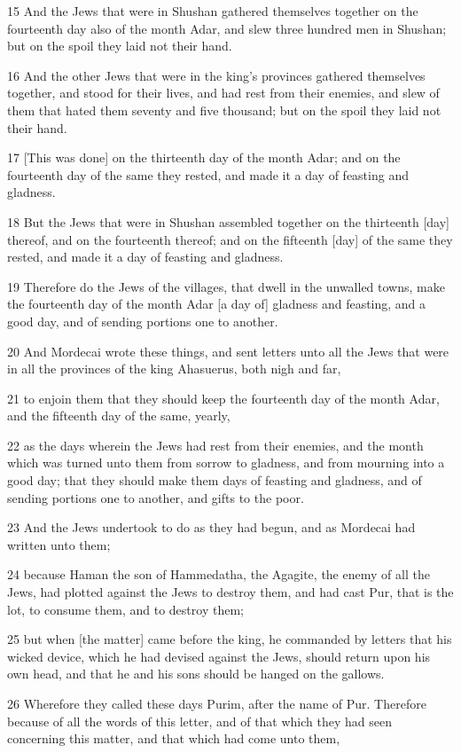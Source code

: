 \par 15 And the Jews that were in Shushan gathered themselves together on the fourteenth day also of the month Adar, and slew three hundred men in Shushan; but on the spoil they laid not their hand.
\par 16 And the other Jews that were in the king's provinces gathered themselves together, and stood for their lives, and had rest from their enemies, and slew of them that hated them seventy and five thousand; but on the spoil they laid not their hand.
\par 17 [This was done] on the thirteenth day of the month Adar; and on the fourteenth day of the same they rested, and made it a day of feasting and gladness.
\par 18 But the Jews that were in Shushan assembled together on the thirteenth [day] thereof, and on the fourteenth thereof; and on the fifteenth [day] of the same they rested, and made it a day of feasting and gladness.
\par 19 Therefore do the Jews of the villages, that dwell in the unwalled towns, make the fourteenth day of the month Adar [a day of] gladness and feasting, and a good day, and of sending portions one to another.
\par 20 And Mordecai wrote these things, and sent letters unto all the Jews that were in all the provinces of the king Ahasuerus, both nigh and far,
\par 21 to enjoin them that they should keep the fourteenth day of the month Adar, and the fifteenth day of the same, yearly,
\par 22 as the days wherein the Jews had rest from their enemies, and the month which was turned unto them from sorrow to gladness, and from mourning into a good day; that they should make them days of feasting and gladness, and of sending portions one to another, and gifts to the poor.
\par 23 And the Jews undertook to do as they had begun, and as Mordecai had written unto them;
\par 24 because Haman the son of Hammedatha, the Agagite, the enemy of all the Jews, had plotted against the Jews to destroy them, and had cast Pur, that is the lot, to consume them, and to destroy them;
\par 25 but when [the matter] came before the king, he commanded by letters that his wicked device, which he had devised against the Jews, should return upon his own head, and that he and his sons should be hanged on the gallows.
\par 26 Wherefore they called these days Purim, after the name of Pur. Therefore because of all the words of this letter, and of that which they had seen concerning this matter, and that which had come unto them,
